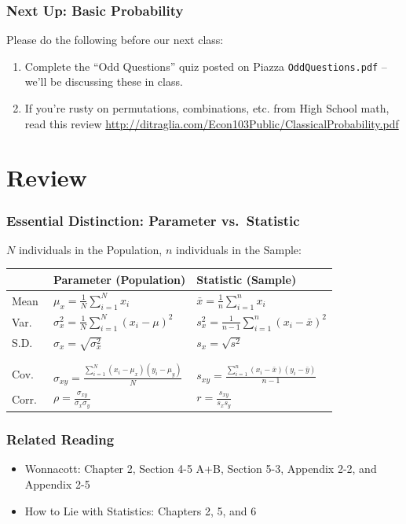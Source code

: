 \documentclass{beamer}
\begin{document}
\begin{frame}
  \frametitle{Next Up: Basic Probability}
  Please do the following before our next class:
      \vspace{1em}
  \begin{enumerate}
    \item Complete the ``Odd Questions'' quiz posted on Piazza \texttt{OddQuestions.pdf} -- we'll be discussing these in class.
      \vspace{1em}
    \item If you're rusty on permutations, combinations, etc. from High School math, read this review \footnotesize \url{http://ditraglia.com/Econ103Public/ClassicalProbability.pdf}
  \end{enumerate}
\end{frame}


\section{Review}
\begin{frame}
\frametitle{Essential Distinction: Parameter vs.\ Statistic}
	$N$ individuals in the Population, $n$ individuals in the Sample:
	\vspace{1em}
	\small
	\begin{tabular}{l|l|l}
		&\textbf{Parameter} (Population)&\textbf{Statistic} (Sample)\\
		\hline
		Mean&$\displaystyle\mu_x = \frac{1}{N} \sum_{i = 1}^N x_i$& $\displaystyle\bar{x} = \frac{1}			{n} \sum_{i = 1}^n x_i$ \\
		Var.\ &$\displaystyle \sigma_x^2 = \frac{1}{N}\sum_{i = 1}^N (x_i - \mu)^2$ &$\displaystyle 			s_x^2 = \frac{1}{n - 1}\sum_{i = 1}^n(x_i - \bar{x})^2$\\
		S.D.\ &$\sigma_x = \sqrt{\sigma_x^2}$ &$s_x = \sqrt{s^2}$ \\
		&&\\
		\hline
		&&\\
		\alert{Cov.\ }&\alert{$\displaystyle \sigma_{xy} = \frac{\sum_{i = 1}^N(x_i - \mu_x)(y_i - 				\mu_y)}{N}$} &\alert{$\displaystyle s_{xy} = \frac{\sum_{i = 1}^n(x_i - \bar{x})(y_i - \bar{y})}			{n - 1}$}\\
		\alert{Corr.\ } & \alert{$\displaystyle \rho = \frac{\sigma_{xy}}{\sigma_x \sigma_y}$}& 					\alert{$\displaystyle r = \frac{s_{xy}}{s_x s_y}$}
	\end{tabular}
\end{frame}

\begin{frame}
\frametitle{Related Reading}
	\begin{itemize}
		\item Wonnacott: Chapter 2, Section 4-5 A+B, Section 5-3, Appendix 2-2, and Appendix 2-5
		\item How to Lie with Statistics: Chapters 2, 5, and 6
	\end{itemize}
\end{frame}

\end{document}
